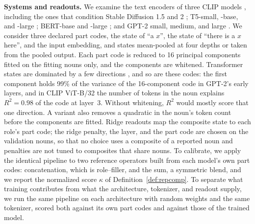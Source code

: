 \documentclass[10pt]{article}
\theoremstyle{plain}
\theoremstyle{remark}
\begin{document}
\textbf{Systems and readouts.} We examine the text encoders of three CLIP models \citep{radford2021clip}, including the ones that condition Stable Diffusion 1.5 and 2 \citep{rombach2022}; T5-small, -base, and -large \citep{raffel2020t5}; BERT-base and -large \citep{devlin2019bert}; and GPT-2 small, medium, and large \citep{radford2019gpt2}. We consider three declared part codes, the state of ``a $x$'', the state of ``there is a $x$ here'', and the input embedding, and states mean-pooled at four depths or taken from the pooled output. Each part code is reduced to 16 principal components fitted on the fitting nouns only, and the components are whitened. Transformer states are dominated by a few directions \citep{ethayarajh2019,timkey2021}, and so are these codes: the first component holds 99\% of the variance of the 16-component code in GPT-2's early layers, and in CLIP ViT-B/32 the number of tokens in the noun explains $R^2 = 0.98$ of the code at layer~3. Without whitening, $R^2$ would mostly score that one direction. A variant also removes a quadratic in the noun's token count before the components are fitted. Ridge readouts map the composite state to each role's part code; the ridge penalty, the layer, and the part code are chosen on the validation nouns, so that no choice uses a composite of a reported noun and penalties are not tuned to composites that share nouns. To calibrate, we apply the identical pipeline to two reference operators built from each model's own part codes: concatenation, which is role--filler, and the sum, a symmetric blend, and we report the normalized score $\kappa$ of Definition~\ref{def:repcomp}. To separate what training contributes from what the architecture, tokenizer, and readout supply, we run the same pipeline on each architecture with random weights and the same tokenizer, scored both against its own part codes and against those of the trained model.
\end{document}
